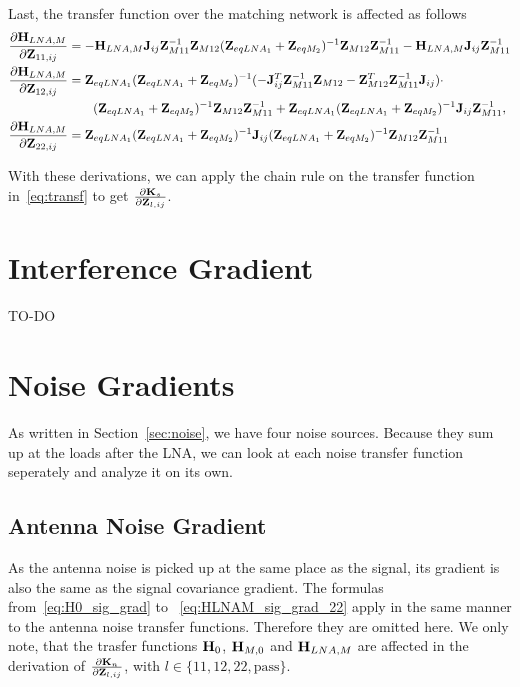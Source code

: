 Last, the transfer function over the matching network is affected as follows
\begin{align}
\label{eq:HLNAM_sig_grad}
\frac{\partial\mathbf{H}_{LNA,M}}{\partial\mathbf{Z}_{11,ij}}&=
-\mathbf{H}_{LNA,M}\mathbf{J}_{ij}\mathbf{Z}_{M11}^{-1}\mathbf{Z}_{M12}(\mathbf{Z}_{eqLNA_1} + \mathbf{Z}_{eqM_2})^{-1}\mathbf{Z}_{M12}\mathbf{Z}_{M11}^{-1}-\mathbf{H}_{LNA,M}\mathbf{J}_{ij}\mathbf{Z}_{M11}^{-1}\\\nonumber
\frac{\partial\mathbf{H}_{LNA,M}}{\partial\mathbf{Z}_{12,ij}}&=
\mathbf{Z}_{eqLNA_1}(\mathbf{Z}_{eqLNA_1} + \mathbf{Z}_{eqM_2})^{-1}(-\mathbf{J}_{ij}^T\mathbf{Z}_{M11}^{-1}\mathbf{Z}_{M12} - \mathbf{Z}_{M12}^T\mathbf{Z}_{M11}^{-1}\mathbf{J}_{ij})\cdot\\
&\qquad(\mathbf{Z}_{eqLNA_1} + \mathbf{Z}_{eqM_2})^{-1}\mathbf{Z}_{M12}\mathbf{Z}_{M11}^{-1} + \mathbf{Z}_{eqLNA_1}(\mathbf{Z}_{eqLNA_1} + \mathbf{Z}_{eqM_2})^{-1}\mathbf{J}_{ij}\mathbf{Z}_{M11}^{-1},\\
\frac{\partial\mathbf{H}_{LNA,M}}{\partial\mathbf{Z}_{22,ij}}&=
\mathbf{Z}_{eqLNA_1}(\mathbf{Z}_{eqLNA_1} + \mathbf{Z}_{eqM_2})^{-1}\mathbf{J}_{ij}(\mathbf{Z}_{eqLNA_1} + \mathbf{Z}_{eqM_2})^{-1}\mathbf{Z}_{M12}\mathbf{Z}_{M11}^{-1}
\label{eq:HLNAM_sig_grad_22}
\end{align}

With these derivations, we can apply the chain rule on the transfer function in~\eqref{eq:transf} to get $\frac{\partial\mathbf{K}_s}{\partial\mathbf{Z}_{l,ij}}$.



\section{Interference Gradient}
\label{sec:interf_gradient}

TO-DO

\section{Noise Gradients}
\label{sec:noise_gradient}

As written in Section~\ref{sec:noise}, we have four noise sources.
Because they sum up at the loads after the LNA, we can look at each noise transfer function seperately and analyze it on its own.

\subsection{Antenna Noise Gradient}
\label{sec:ant_noise_grad}
As the antenna noise is picked up at the same place as the signal, its gradient is also the same as the signal covariance gradient.
The formulas from~\eqref{eq:H0_sig_grad} to ~\eqref{eq:HLNAM_sig_grad_22} apply in the same manner to the antenna noise transfer functions.
Therefore they are omitted here.
We only note, that the trasfer functions $\mathbf{H}_{0}$, $\mathbf{H}_{M,0}$ and $\mathbf{H}_{LNA,M}$ are affected in the derivation of $\frac{\partial\mathbf{K}_n}{\partial\mathbf{Z}_{l,ij}}$, with $l\in\{11,12,22,\text{pass}\}$.

